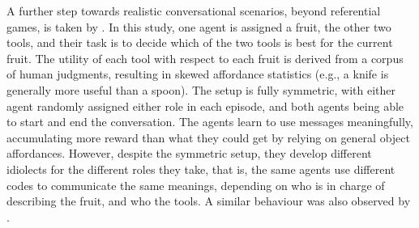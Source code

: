 A further step towards realistic conversational scenarios, beyond
referential games, is taken by  \cite<see also>{Cao:etal:2018}. In this study, one agent is assigned a
fruit, the other two tools, and their task is to decide which of the
two tools is best for the current fruit. The utility of each tool with
respect to each fruit is derived from a corpus of human judgments,
resulting in skewed affordance statistics (e.g., a knife is generally
more useful than a spoon). The setup is fully symmetric, with either
agent randomly assigned either role in each episode, and both agents
being able to start and end the conversation. The agents learn to use
messages meaningfully, accumulating more reward than what they could
get by relying on general object affordances. However, despite the
symmetric setup, they develop different idiolects for the different
roles they take, that is, the same agents use different codes to
communicate the same meanings, depending on who is in charge of describing the fruit, and who the tools. A similar behaviour  was also observed by .

